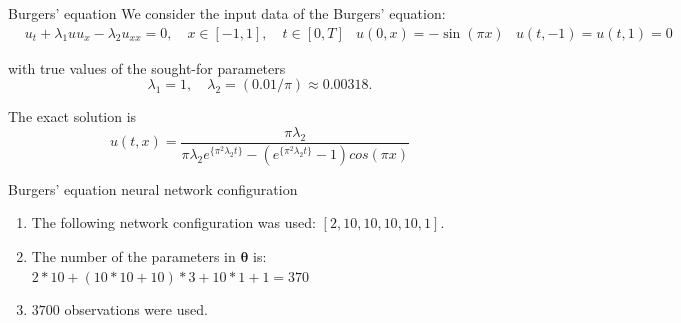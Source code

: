\documentclass{beamer}
\def\\{}%
\begin{document}
\begin{frame}{Burgers' equation}
We consider the input data of the Burgers' equation:
\begin{align*}
&u_t + \lambda_1 u u_x - \lambda_2 u_{xx} = 0, \quad x\in[-1, 1], \quad t\in[0, T]\\
&u(0, x) = -\sin(\pi x) \\
&u(t, -1) = u(t, 1) = 0
\end{align*}

with true values of the sought-for parameters
\[
    \lambda_1 = 1,  \quad \lambda_2 = (0.01 / \pi) \approx 0.00318.
\]

The exact solution is
$$u(t, x) = \frac{\pi \lambda_2}{\pi \lambda_2 e^{\{\pi^2 \lambda_2 t\}} - (e^{\{\pi^2 \lambda_2 t\}} - 1) cos(\pi x)}$$

\end{frame}


%    
    
\begin{frame}{Burgers' equation neural network configuration}
\begin{enumerate}
    \item The following network configuration was used:\\
$[2, 10, 10, 10, 10, 1]$.
    \item The number of the parameters in $\boldsymbol{\theta}$ is: \\
$2*10 + (10*10 + 10)*3 + 10*1 + 1 = 370$\\
    \item $3700$ observations were used.
\end{enumerate}

\end{frame}
\end{document}
